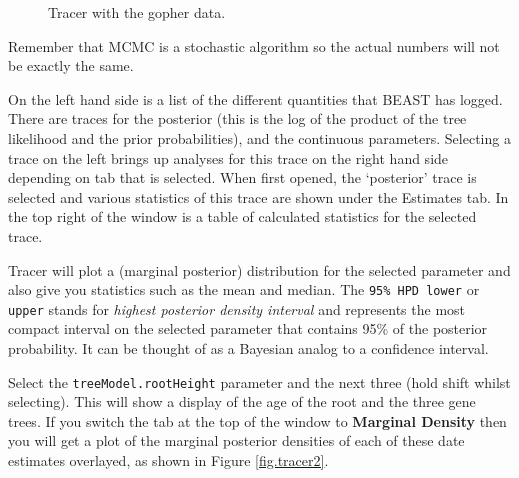 \documentclass{article}
\begin{document}
\begin{figure}
\begin{center}


\end{center}
\caption{\label{fig.tracer1} Tracer with the gopher data.}
\end{figure}


Remember that MCMC is a stochastic algorithm so the actual numbers will not be exactly the same.

On the left hand side is a list of the different quantities that BEAST has logged. There are traces for the posterior (this
is the log of the product of the tree likelihood and the prior probabilities), and the continuous parameters. Selecting a trace
on the left brings up analyses for this trace on the right hand side depending on tab that is selected. When first opened, the
`posterior' trace is selected and various statistics of this trace are shown under the Estimates tab.
In the top right of the window is a table of calculated statistics for the selected trace. 

Tracer will plot a (marginal posterior) distribution for the selected parameter and also give you statistics such as the mean and median. The \texttt{95\% HPD lower} or \texttt {upper} stands for {\it highest posterior density interval} and represents the most compact interval on the selected parameter that contains 95\% of the posterior probability. It can be thought of as a Bayesian analog to a confidence interval. 

Select the \texttt{treeModel.rootHeight} parameter and the next three (hold shift whilst selecting). This will show a display of the
age of the root and the three gene trees. If you switch the tab at the top of the window to {\bf Marginal Density} then you will get a plot of the marginal posterior densities of each of these date estimates overlayed,
as shown in Figure \ref{fig.tracer2}.
\end{document}
